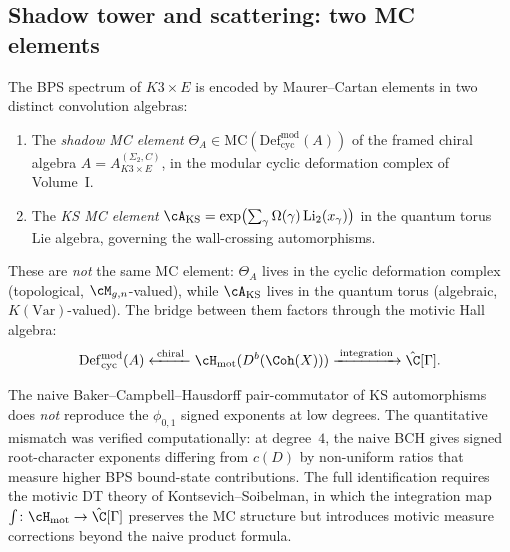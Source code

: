 \subsection{Shadow tower and scattering: two MC elements}
\label{subsec:k3e-shadow-scattering}

\begin{conjecture}
\label{conj:k3e-two-mc}
The BPS spectrum of $K3 \times E$ is encoded by Maurer--Cartan elements in two distinct convolution algebras:
\begin{enumerate}[label=(\roman*)]
 \item The \emph{shadow MC element} $\Theta_A \in \mathrm{MC}(\mathrm{Def}_{\mathrm{cyc}}^{\mathrm{mod}}(A))$ of the framed chiral algebra $A = A_{K3 \times E}^{(\Sigma_2,C)}$, in the modular cyclic deformation complex of Volume~I.
 \item The \emph{KS MC element} $\cA_{\mathrm{KS}} = \exp\bigl(\sum_\gamma \Omega(\gamma) \, \mathrm{Li}_2(x_\gamma)\bigr)$ in the quantum torus Lie algebra, governing the wall-crossing automorphisms.
\end{enumerate}
These are \emph{not} the same MC element: $\Theta_A$ lives in the cyclic deformation complex (topological, $\cM_{g,n}$-valued), while $\cA_{\mathrm{KS}}$ lives in the quantum torus (algebraic, $K(\mathrm{Var})$-valued). The bridge between them factors through the motivic Hall algebra:
\[
 \mathrm{Def}_{\mathrm{cyc}}^{\mathrm{mod}}(A) \xleftarrow{\;\text{chiral}\;} \cH_{\mathrm{mot}}(D^b(\Coh(X))) \xrightarrow{\;\text{integration}\;} \hat{\C}[\Gamma].
\]
\end{conjecture}

\begin{remark}
\label{rem:k3e-naive-bch}
The naive Baker--Campbell--Hausdorff pair-commutator of KS automorphisms does \emph{not} reproduce the $\phi_{0,1}$ signed exponents at low degrees. The quantitative mismatch was verified computationally: at degree~$4$, the naive BCH gives signed root-character exponents differing from $c(D)$ by non-uniform ratios that measure higher BPS bound-state contributions. The full identification requires the motivic DT theory of Kontsevich--Soibelman, in which the integration map $\int \colon \cH_{\mathrm{mot}} \to \hat{\C}[\Gamma]$ preserves the MC structure but introduces motivic measure corrections beyond the naive product formula.
\end{remark}

